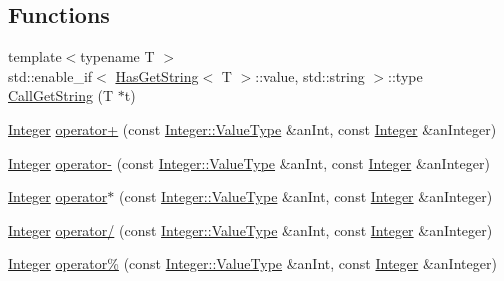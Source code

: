 \subsection*{Functions}
\begin{DoxyCompactItemize}
\item 
{\footnotesize template$<$typename T $>$ }\\std\+::enable\+\_\+if$<$ \hyperlink{classlibrary_1_1core_1_1types_1_1_has_get_string}{Has\+Get\+String}$<$ T $>$\+::value, std\+::string $>$\+::type \hyperlink{namespacelibrary_1_1core_1_1types_a5715d27d021d9d7a6c766a6d3917a96d}{Call\+Get\+String} (T $\ast$t)
\item 
\hyperlink{classlibrary_1_1core_1_1types_1_1_integer}{Integer} \hyperlink{namespacelibrary_1_1core_1_1types_a129fe9eb5778273d662e141e23779fc3}{operator+} (const \hyperlink{classlibrary_1_1core_1_1types_1_1_integer_a623afb1580f870fd8a1997b1c12c917d}{Integer\+::\+Value\+Type} \&an\+Int, const \hyperlink{classlibrary_1_1core_1_1types_1_1_integer}{Integer} \&an\+Integer)
\item 
\hyperlink{classlibrary_1_1core_1_1types_1_1_integer}{Integer} \hyperlink{namespacelibrary_1_1core_1_1types_a6babebcdc3f674f593eb5e1b93b78523}{operator-\/} (const \hyperlink{classlibrary_1_1core_1_1types_1_1_integer_a623afb1580f870fd8a1997b1c12c917d}{Integer\+::\+Value\+Type} \&an\+Int, const \hyperlink{classlibrary_1_1core_1_1types_1_1_integer}{Integer} \&an\+Integer)
\item 
\hyperlink{classlibrary_1_1core_1_1types_1_1_integer}{Integer} \hyperlink{namespacelibrary_1_1core_1_1types_abc5a3a409f7959b3f0130b2cbb7c3310}{operator$\ast$} (const \hyperlink{classlibrary_1_1core_1_1types_1_1_integer_a623afb1580f870fd8a1997b1c12c917d}{Integer\+::\+Value\+Type} \&an\+Int, const \hyperlink{classlibrary_1_1core_1_1types_1_1_integer}{Integer} \&an\+Integer)
\item 
\hyperlink{classlibrary_1_1core_1_1types_1_1_integer}{Integer} \hyperlink{namespacelibrary_1_1core_1_1types_af520df27ed5123ce801e1d397bfd3234}{operator/} (const \hyperlink{classlibrary_1_1core_1_1types_1_1_integer_a623afb1580f870fd8a1997b1c12c917d}{Integer\+::\+Value\+Type} \&an\+Int, const \hyperlink{classlibrary_1_1core_1_1types_1_1_integer}{Integer} \&an\+Integer)
\item 
\hyperlink{classlibrary_1_1core_1_1types_1_1_integer}{Integer} \hyperlink{namespacelibrary_1_1core_1_1types_a8f47532e1d4e458682cf744716ecd6a1}{operator\%} (const \hyperlink{classlibrary_1_1core_1_1types_1_1_integer_a623afb1580f870fd8a1997b1c12c917d}{Integer\+::\+Value\+Type} \&an\+Int, const \hyperlink{classlibrary_1_1core_1_1types_1_1_integer}{Integer} \&an\+Integer)

\end{DoxyCompactItemize}
